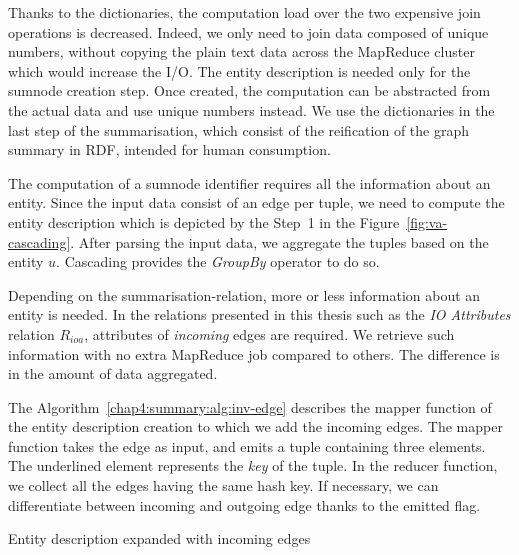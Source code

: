 Thanks to the dictionaries, the computation load over the two expensive join operations is decreased. Indeed, we only need to join data composed of unique numbers, without copying the plain text data across the MapReduce cluster which would increase the I/O. The entity description is needed only for the sumnode creation step. Once created, the computation can be abstracted from the actual data and use unique numbers instead. We use the dictionaries in the last step of the summarisation, which consist of the reification of the graph summary in RDF, intended for human consumption.


The computation of a sumnode identifier requires all the information about an entity. Since the input data consist of an edge per tuple, we need to compute the entity description  which is depicted by the Step~1 in the Figure~\ref{fig:va-cascading}. After parsing the input data, we aggregate the tuples based on the entity $u$. Cascading provides the \emph{GroupBy} operator to do so.

Depending on the \gls{summarisation-relation}, more or less information about an entity is needed. In the relations presented in this thesis such as the \emph{IO Attributes} relation $R_{ioa}$, attributes of \emph{incoming} edges are required. We retrieve such information with no extra MapReduce job compared to others. The difference is in the amount of data aggregated.

The Algorithm~\ref{chap4:summary:alg:inv-edge} describes the mapper function of the entity description creation to which we add the incoming edges. The mapper function takes the edge as input, and emits a tuple containing three elements. The underlined element represents the \emph{key} of the tuple. In the reducer function, we collect all the edges having the same hash key. If necessary, we can differentiate between incoming and outgoing edge thanks to the emitted flag.

\begin{algorithm}
	\DontPrintSemicolon
	\BlankLine
	\caption{Entity description expanded with incoming edges}
	\label{chap4:summary:alg:inv-edge}
\end{algorithm}

